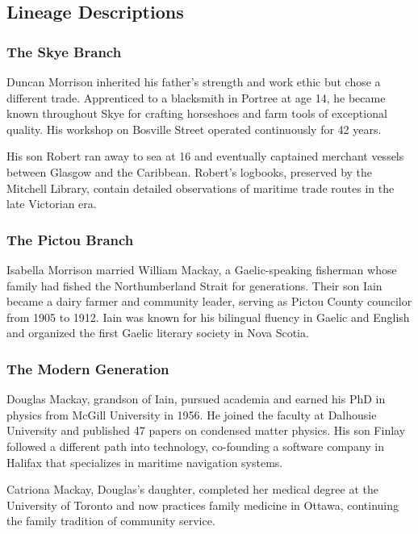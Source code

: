 \documentclass[
    language=english,
    doctype=family-tree,
    institution=none,
]{../../omnilatex}
\begin{document}
\subsection{Lineage Descriptions}

\subsubsection{The Skye Branch}

Duncan Morrison inherited his father's strength and work ethic but chose a different trade. Apprenticed to a blacksmith in Portree at age 14, he became known throughout Skye for crafting horseshoes and farm tools of exceptional quality. His workshop on Bosville Street operated continuously for 42 years.

His son Robert ran away to sea at 16 and eventually captained merchant vessels between Glasgow and the Caribbean. Robert's logbooks, preserved by the Mitchell Library, contain detailed observations of maritime trade routes in the late Victorian era.

\subsubsection{The Pictou Branch}

Isabella Morrison married William Mackay, a Gaelic-speaking fisherman whose family had fished the Northumberland Strait for generations. Their son Iain became a dairy farmer and community leader, serving as Pictou County councilor from 1905 to 1912. Iain was known for his bilingual fluency in Gaelic and English and organized the first Gaelic literary society in Nova Scotia.

\subsubsection{The Modern Generation}

Douglas Mackay, grandson of Iain, pursued academia and earned his PhD in physics from McGill University in 1956. He joined the faculty at Dalhousie University and published 47 papers on condensed matter physics. His son Finlay followed a different path into technology, co-founding a software company in Halifax that specializes in maritime navigation systems.

Catriona Mackay, Douglas's daughter, completed her medical degree at the University of Toronto and now practices family medicine in Ottawa, continuing the family tradition of community service.
\end{document}
